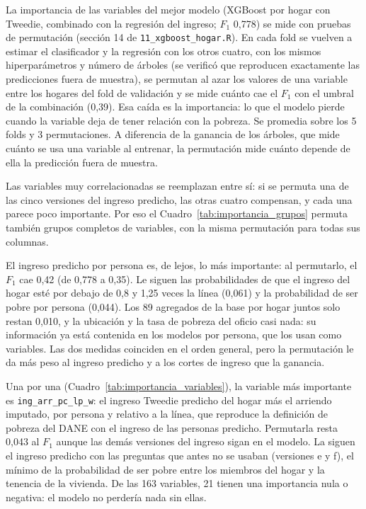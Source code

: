 \documentclass[12pt]{article}
\begin{document}
La importancia de las variables del mejor modelo (XGBoost por hogar con
Tweedie, combinado con la regresión del ingreso; $F_1$ 0,778) se mide con
pruebas de permutación (sección 14 de \texttt{11\_xgboost\_hogar.R}). En cada
fold se vuelven a estimar el clasificador y la regresión con los otros cuatro,
con los mismos hiperparámetros y número de árboles (se verificó que
reproducen exactamente las predicciones fuera de muestra), se permutan al azar
los valores de una variable entre los hogares del fold de validación y se
mide cuánto cae el $F_1$ con el umbral de la combinación (0,39). Esa caída es
la importancia: lo que el modelo pierde cuando la variable deja de tener
relación con la pobreza. Se promedia sobre los 5 folds y 3 permutaciones. A
diferencia de la ganancia de los árboles, que mide cuánto se usa una variable
al entrenar, la permutación mide cuánto depende de ella la predicción fuera
de muestra.

Las variables muy correlacionadas se reemplazan entre sí: si se permuta una
de las cinco versiones del ingreso predicho, las otras cuatro compensan, y
cada una parece poco importante. Por eso el Cuadro~\ref{tab:importancia_grupos}
permuta también grupos completos de variables, con la misma permutación para
todas sus columnas.



El ingreso predicho por persona es, de lejos, lo más importante: al
permutarlo, el $F_1$ cae 0,42 (de 0,778 a 0,35). Le siguen las probabilidades
de que el ingreso del hogar esté por debajo de 0,8 y 1,25 veces la línea
(0,061) y la probabilidad de ser pobre por persona (0,044). Los 89 agregados
de la base por hogar juntos solo restan 0,010, y la ubicación y la tasa de
pobreza del oficio casi nada: su información ya está contenida en los modelos
por persona, que los usan como variables. Las dos medidas coinciden en el
orden general, pero la permutación le da más peso al ingreso predicho y a los
cortes de ingreso que la ganancia.



Una por una (Cuadro~\ref{tab:importancia_variables}), la variable más
importante es \texttt{ing\_arr\_pc\_lp\_w}: el ingreso Tweedie predicho del
hogar más el arriendo imputado, por persona y relativo a la línea, que
reproduce la definición de pobreza del DANE con el ingreso de las personas
predicho. Permutarla resta 0,043 al $F_1$ aunque las demás versiones del
ingreso sigan en el modelo. La siguen el ingreso predicho con las preguntas
que antes no se usaban (versiones e y f), el mínimo de la probabilidad de
ser pobre entre los miembros del hogar y la tenencia de la vivienda. De las
163 variables, 21 tienen una importancia nula o negativa: el modelo no
perdería nada sin ellas.
\end{document}
